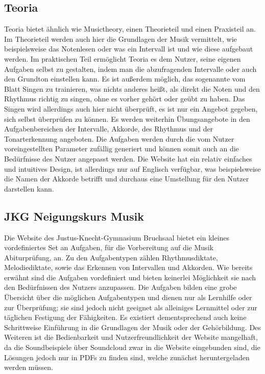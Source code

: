 \subsection*{Teoria}
\label{sec:Teoria}
Teoria bietet ähnlich wie Musictheory, einen Theorieteil und einen Praxisteil an. Im Theorieteil werden auch hier die Grundlagen der Musik vermittelt, wie beispielsweise das Notenlesen oder was ein Intervall ist und wie diese aufgebaut werden.
Im praktischen Teil ermöglicht Teoria es dem Nutzer, seine eigenen Aufgaben selbst zu gestalten, indem man die abzufragenden Intervalle oder auch den Grundton einstellen kann. Es ist außerdem möglich, das sogenannte vom Blatt Singen zu trainieren, was nichts anderes
heißt, als direkt die Noten und den Rhythmus richtig zu singen, ohne es vorher gehört oder geübt zu haben. Das Singen wird allerdings auch hier nicht überprüft, es ist nur ein Angebot gegeben, sich selbst überprüfen zu können. Es werden weiterhin Übungsangebote in den
Aufgabenbereichen der Intervalle, Akkorde, des Rhythmus und der Tonarterkennung angeboten. Die Aufgaben werden durch die vom Nutzer voreingestellten Parameter zufällig generiert und können somit auch an die Bedürfnisse des Nutzer angepasst werden. Die Website hat ein relativ einfaches und intuitives Design, ist allerdings nur auf Englisch verfügbar, was beispielsweise die Namen der Akkorde betrifft und durchaus eine Umstellung für den Nutzer darstellen kann. \cite{teoria}

\subsection*{JKG Neigungskurs Musik}
\label{sec:Neigungskurs}
Die Website des Justus-Knecht-Gymnasium Bruchsaal bietet ein kleines vordefiniertes Set an Aufgaben, für die Vorbereitung auf die Musik Abiturprüfung, an. Zu den Aufgabentypen zählen Rhythmusdiktate, Melodiediktate, sowie das Erkennen von Intervallen und Akkorden.
Wie bereits erwähnt sind die Aufgaben vordefiniert und bieten keinerlei Möglichkeit sie nach den Bedürfnissen des Nutzers anzupassen. Die Aufgaben bilden eine grobe Übersicht über die möglichen Aufgabentypen und dienen nur als Lernhilfe oder zur Überprüfung; sie sind jedoch nicht geeignet als alleiniges Lernmittel oder zur täglichen Festigung der Fähigkeiten. Es existiert dementsprechend auch keine Schrittweise Einführung in die Grundlagen der Musik oder der Gehörbildung. Des Weiteren ist die Bedienbarkeit und Nutzerfreundlichkeit der Website mangelhaft, da die Soundbeispiele über Soundcloud zwar in die Website eingebunden sind, die Lösungen jedoch nur in 
PDFs zu finden sind, welche zunächst heruntergeladen werden müssen. \cite{jkg_bruch}

